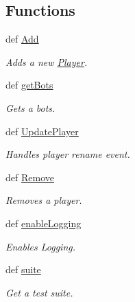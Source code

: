 \subsection*{\-Functions}
\begin{DoxyCompactItemize}
\item 
def \hyperlink{namespace_player_a1d801e5ff1ac1ae9988c45b1af411de2}{\-Add}
\begin{DoxyCompactList}\small\item\em \-Adds a new \hyperlink{namespace_player}{\-Player}. \end{DoxyCompactList}\item 
def \hyperlink{namespace_player_a1afb4d06fdc03bfd6675b0e86335ec52}{get\-Bots}
\begin{DoxyCompactList}\small\item\em \-Gets a bots. \end{DoxyCompactList}\item 
def \hyperlink{namespace_player_a3627dcb2d0a4a91d436054702ff27560}{\-Update\-Player}
\begin{DoxyCompactList}\small\item\em \-Handles player rename event. \end{DoxyCompactList}\item 
def \hyperlink{namespace_player_a95df1c4a8c0286782aadb95739cf71e9}{\-Remove}
\begin{DoxyCompactList}\small\item\em \-Removes a player. \end{DoxyCompactList}\item 
def \hyperlink{namespace_player_a2e7b8308089312cc7fc6ead28c5bc36a}{enable\-Logging}
\begin{DoxyCompactList}\small\item\em \-Enables \-Logging. \end{DoxyCompactList}\item 
\hypertarget{namespace_player_ac46a6715bfd2a9794e002f60e64eb591}{
def \hyperlink{namespace_player_ac46a6715bfd2a9794e002f60e64eb591}{suite}}
\label{namespace_player_ac46a6715bfd2a9794e002f60e64eb591}

\begin{DoxyCompactList}\small\item\em \-Get a test suite. \end{DoxyCompactList}\end{DoxyCompactItemize}
